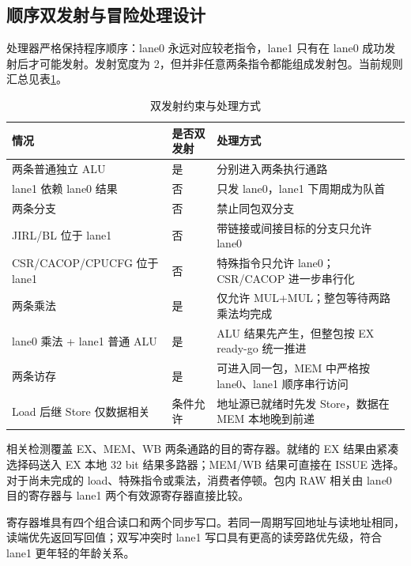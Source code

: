 \documentclass[UTF8,a4paper,zihao=5,fontset=none]{ctexart}
\begin{document}
\subsection{顺序双发射与冒险处理设计}

处理器严格保持程序顺序：lane0 永远对应较老指令，lane1 只有在 lane0 成功发射后才可能发射。发射宽度为 2，但并非任意两条指令都能组成发射包。当前规则汇总见表\ref{tab:issue_rules}。

\begin{table}[H]
  \centering
  \caption{双发射约束与处理方式}
  \label{tab:issue_rules}
  \begin{tabularx}{\textwidth}{p{3.3cm} p{2.2cm} X}
    \toprule
    情况                        & 是否双发射 & 处理方式                               \\
    \midrule
    两条普通独立 ALU                & 是     & 分别进入两条执行通路                         \\
    lane1 依赖 lane0 结果         & 否     & 只发 lane0，lane1 下周期成为队首             \\
    两条分支                      & 否     & 禁止同包双分支                            \\
    JIRL/BL 位于 lane1          & 否     & 带链接或间接目标的分支只允许 lane0               \\
    CSR/CACOP/CPUCFG 位于 lane1 & 否     & 特殊指令只允许 lane0；CSR/CACOP 进一步串行化     \\
    两条乘法                      & 是     & 仅允许 MUL+MUL；整包等待两路乘法均完成            \\
    lane0 乘法 + lane1 普通 ALU   & 是     & ALU 结果先产生，但整包按 EX ready-go 统一推进    \\
    两条访存                      & 是     & 可进入同一包，MEM 中严格按 lane0、lane1 顺序串行访问 \\
    Load 后继 Store 仅数据相关       & 条件允许  & 地址源已就绪时先发 Store，数据在 MEM 本地晚到前递     \\
    \bottomrule
  \end{tabularx}
\end{table}

相关检测覆盖 EX、MEM、WB 两条通路的目的寄存器。就绪的 EX 结果由紧凑选择码送入 EX 本地 32 bit 结果多路器；MEM/WB 结果可直接在 ISSUE 选择。对于尚未完成的 load、特殊指令或乘法，消费者停顿。包内 RAW 相关由 lane0 目的寄存器与 lane1 两个有效源寄存器直接比较。

寄存器堆具有四个组合读口和两个同步写口。若同一周期写回地址与读地址相同，读端优先返回写回值；双写冲突时 lane1 写口具有更高的读旁路优先级，符合 lane1 更年轻的年龄关系。
\end{document}
